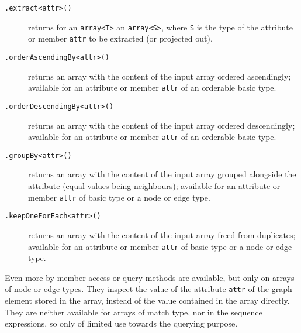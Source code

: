 \begin{description}
\item[\texttt{.extract<attr>()}] returns for an \texttt{array<T>} an \texttt{array<S>}, where \texttt{S} is the type of the attribute or member \texttt{attr} to be extracted (or projected out).
\item[\texttt{.orderAscendingBy<attr>()}] returns an array with the content of the input array ordered ascendingly; available for an attribute or member \texttt{attr} of an orderable basic type.
\item[\texttt{.orderDescendingBy<attr>()}] returns an array with the content of the input array ordered descendingly; available for an attribute or member \texttt{attr} of an orderable basic type.
\item[\texttt{.groupBy<attr>()}] returns an array with the content of the input array grouped alongside the attribute (equal values being neighbours); available for an attribute or member \texttt{attr} of basic type or a node or edge type.
\item[\texttt{.keepOneForEach<attr>()}] returns an array with the content of the input array freed from duplicates; available for an attribute or member \texttt{attr} of basic type or a node or edge type.
\end{description}\label{arraybymemberaccessmethod}

\noindent Even more by-member access or query methods are available, but only on arrays of node or edge types.
They inspect the value of the attribute \texttt{attr} of the graph element stored in the array, instead of the value contained in the array directly.
They are neither available for arrays of match type, nor in the sequence expressions, so only of limited use towards the querying purpose.

